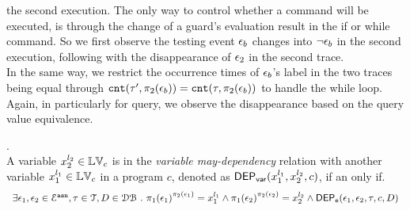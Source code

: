 {the second execution. 
The only way to control whether a command will be executed, is through the change of a guard's 
evaluation result in the if or while command.
So we first observe the testing event $\mathtt{\epsilon}_b$ changes into $\neg \mathtt{\epsilon}_b$ in the second execution, 
following with the disappearance of $\mathtt{\epsilon}_2$ in the second trace.
\\
In the same way, we restrict the occurrence times of $\mathtt{\epsilon}_b$'s label in the two traces being equal
through $\mathtt{cnt}(\mathtt{\tau}', \pi_2(\mathtt{\epsilon}_b)) = \mathtt{cnt}(\mathtt{\tau}, \pi_2(\mathtt{\epsilon}_b)) $ to handle the while loop.
Again, in particularly for query, we observe the disappearance based on the query value equivalence.
}
\begin{defn}.
  \label{def:var_dep}
  \\
  A variable ${x}_2^{l_2} \in \mathbb{LV}_{{c}}$ is in the \emph{variable may-dependency} relation with another
  variable ${x}_1^{l_1} \in \mathbb{LV}_{{c}}$ in a program ${c}$, denoted as 
  $\mathsf{DEP_{var}}({x}_1^{l_1}, {x}_2^{l_2}, {c})$, if an only if.
\[
  \begin{array}{l}
\exists \event_1, \event_2 \in \eventset^{\asn}, \trace \in \mathcal{T} , D \in \dbdom \st
\pi_{1}{(\event_1)}^{\pi_{2}{(\event_1)}} = {x}_1^{l_1}
\land
\pi_{1}{(\event_2)}^{\pi_{2}{(\event_2)}} = {x}_2^{l_2}%
\land 
\eventdep(\event_1, \event_2, \trace, c, D) 
  \end{array}
\]  %
  \end{defn}
